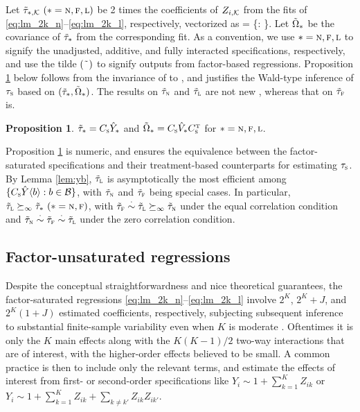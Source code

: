 \documentclass[11pt]{article}
\theoremstyle{definition}
\newtheorem{proposition}{Proposition}
\begin{document}
Let $\tilde\tau_{*, \mathcal{K}} \ (* =\textsc{n}, \textsc{f}, \textsc{l})$ be 2 times the coefficients of $Z_{i, \mathcal{K}}$ from the \olss fits of \eqref{eq:lm_2k_n}--\eqref{eq:lm_2k_l}, respectively, vectorized as 
\begina
\tts = \{\ttsmk: \mk\in\pk\}.
\enda
Let $\tilde \Omega_*$ be the \ehws covariance of $\tilde\tau_{*}$ from the corresponding \olss fit. 
As a convention, we use $* =\textsc{n}, \textsc{f}, \textsc{l}$ to signify the unadjusted, additive, and fully interacted specifications, respectively, and use the tilde $(\tilde{\color{white}\tau})$ to signify outputs from factor-based regressions. 
Proposition \ref{prop:2k_saturated} below follows from the invariance of \olss to {\ndt}, and justifies the Wald-type inference of $\tau_{\textsc{s}}$ based on  $(\tilde\tau_{*}, \tilde \Omega_*)$.  
The results on $\tilde\tau_{\textsc{n}}$ and $\tilde\tau_{\textsc{l}}$ are not new \citep{lu2016covariate, ZDa}, whereas that on $\tilde\tau_{\textsc{f}}$ is. 

\begin{proposition}\label{prop:2k_saturated}
$\tilde\tau_{*}  = C_{\textsc{s}} \hat Y_*$ and $\tilde \Omega_* = C_{\textsc{s}} \hat V_* C_{\textsc{s}}^{ \mathrm{\scriptscriptstyle T} }$  for $* =\textsc{n}, \textsc{f}, \textsc{l}$. 
\end{proposition}

Proposition \ref{prop:2k_saturated} is numeric,  and ensures the equivalence between the factor-saturated specifications and their treatment-based counterparts for estimating $\tau_{\textsc{s}}$. 
By Lemma \ref{lem:yb},  $\tilde\tau_{\textsc{l}}$ is asymptotically the most efficient among $\{C_{\textsc{s}} \hat Y\langle b \rangle: b\in\mathcal{B}\}$, with $\tilde\tau_{\textsc{n}}$ and $\tilde\tau_{\textsc{f}}$  being special cases. In particular, $\tilde\tau_{\textsc{l}} \succeq_\infty \tilde\tau_{*} \ (* = \textsc{n}, \textsc{f})$, with
 $\tilde\tau_{\textsc{f}} \overset{\cdot}{\sim} \tilde\tau_{\textsc{l}}    \succeq_\infty \tilde\tau_{\textsc{n}}$ under the equal correlation condition and 
$\tilde\tau_{\textsc{n}}\overset{\cdot}{\sim}\tilde\tau_{\textsc{f}} \overset{\cdot}{\sim} \tilde\tau_{\textsc{l}}     $ under the zero correlation condition. 




\subsection{Factor-unsaturated regressions}
Despite the conceptual straightforwardness and nice theoretical guarantees, 
the factor-saturated regressions \eqref{eq:lm_2k_n}--\eqref{eq:lm_2k_l} involve $2^K$, $2^K+J$, and $2^K(1+J)$ estimated coefficients, respectively, subjecting subsequent inference to substantial finite-sample variability even when $K$ is moderate \citep{ZDa}.  Oftentimes it is only the $K$ main effects along with the $K(K-1)/2$ two-way interactions that are of interest, with the higher-order effects believed to be small. A common practice is then to include only the relevant terms, and estimate the effects of interest from  first- or second-order  specifications like
$Y_i \sim 1+ \sum_{k=1}^K Z_{ik}$ or $Y_i \sim 1+ \sum_{k=1}^K Z_{ik} + \sum_{k\neq k'} Z_{ik} Z_{ik'}$. 
%
\end{document}
